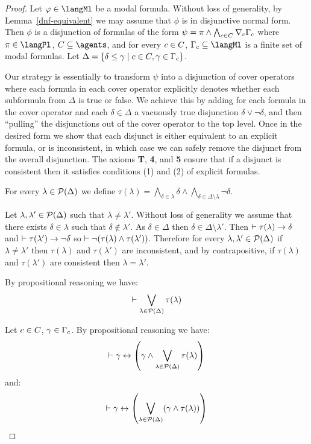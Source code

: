\begin{proof}
Let $\phi \in \langMl$ be a modal formula.
Without loss of generality, by Lemma~\ref{dnf-equivalent} we may assume that $\phi$ is in disjunctive normal form.
Then $\phi$ is a disjunction of formulas of the form $\psi = \pi \land \bigwedge_{c \in C} \nabla_{c} \Gamma_c$ where $\pi \in \langPl$, $\agentsC \subseteq \agents$, and for every $c \in C$, $\Gamma_\agentC \subseteq \langMl$ is a finite set of modal formulas.
Let $\Delta = \{\delta \leq \gamma \mid c \in C, \gamma \in \Gamma_c\}$.

Our strategy is essentially to transform $\psi$ into a disjunction of cover operators where each formula in each cover operator explicitly denotes whether each subformula from $\Delta$ is true or false.
We achieve this by adding for each formula in the cover operator and each $\delta \in \Delta$ a vacuously true disjunction $\delta \lor \lnot \delta$, and then ``pulling'' the disjunctions out of the cover operator to the top level.
Once in the desired form we show that each disjunct is either equivalent to an explicit formula, or is inconsistent, in which case we can safely remove the disjunct from the overall disjunction.
The \axiomS{} axioms {\bf T}, {\bf 4}, and {\bf 5} ensure that if a disjunct is consistent then it satisfies conditions (1) and (2) of explicit formulas.

For every $\lambda \in \mathcal{P}(\Delta)$ we define $\tau(\lambda) = \bigwedge_{\delta \in \lambda} \delta \land \bigwedge_{\delta \in \Delta \setminus \lambda} \lnot \delta$.

Let $\lambda, \lambda' \in \mathcal{P}(\Delta)$ such that $\lambda \neq \lambda'$.
Without loss of generality we assume that there exists $\delta \in \lambda$ such that $\delta \notin \lambda'$.
As $\delta \in \Delta$ then $\delta \in \Delta \setminus \lambda'$.
Then $\vdash \tau(\lambda) \rightarrow \delta$ and $\vdash \tau(\lambda') \rightarrow \lnot \delta$ so $\vdash \lnot (\tau(\lambda) \land \tau(\lambda'))$.
Therefore for every $\lambda, \lambda' \in \mathcal{P}(\Delta)$ if $\lambda \neq \lambda'$ then $\tau(\lambda)$ and $\tau(\lambda')$ are inconsistent,
and by contrapositive, if $\tau(\lambda)$ and $\tau(\lambda')$ are consistent then $\lambda = \lambda'$.

By propositional reasoning we have:
$$
\vdash \bigvee_{\lambda \in \mathcal{P}(\Delta)} \tau(\lambda)
$$

Let $c \in C$, $\gamma \in \Gamma_c$.
By propositional reasoning we have:
$$
\vdash \gamma \leftrightarrow \left(\gamma \land \bigvee_{\lambda \in \mathcal{P}(\Delta)} \tau(\lambda)\right)
$$
and:
$$
\vdash \gamma \leftrightarrow \left(\bigvee_{\lambda \in \mathcal{P}(\Delta)} (\gamma \land \tau(\lambda))\right)
$$


\end{proof}
